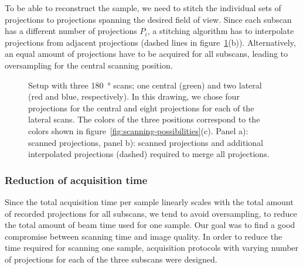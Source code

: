 To be able to reconstruct the sample, we need to stitch the individual sets of projections to projections spanning the desired field of view. Since each subscan has a different number of projections $P_{i}$, a stitching algorithm has to interpolate projections from adjacent projections (dashed lines in figure~\ref{fig:projections}(b)). Alternatively, an equal amount of projections have to be acquired for all subscans, leading to oversampling for the central scanning position.

\ifiucr
	\begin{figure}%
		\caption{Setup with three \SI{180}{\degree} scans; one central (green) and two lateral (red and blue, respectively). In this drawing, we chose four projections for the central and eight projections for each of the lateral scans. The colors of the three positions correspond to the colors shown in figure~\ref{fig:scanning-possibilities}(c). Panel a): scanned projections, panel b): scanned projections and additional interpolated projections (dashed) required to merge all projections.}%
		\label{fig:projections}%
	\end{figure}%
\else
	\begin{figure*}[htp]
		\centering
		\caption{Setup with three \SI{180}{\degree} scans; one central (green) and two lateral (red and blue, respectively). In this drawing, we chose four projections for the central and eight projections for each of the lateral scans. The colors of the three positions correspond to the colors shown in figure~\ref{fig:scanning-possibilities}(c). Panel a): scanned projections, panel b): scanned projections and additional interpolated projections (dashed) required to merge all projections.}%
		\label{fig:projections}
	\end{figure*}
\fi

\subsubsection{Reduction of acquisition time}
\label{subsubsec:reduction-of-acquisition-time}
Since the total acquisition time per sample linearly scales with the total amount of recorded projections for all subscans, we tend to avoid oversampling, to reduce the total amount of beam time used for one sample. Our goal was to find a good compromise between scanning time and image quality. In order to reduce the time required for scanning one sample, acquisition protocols with varying number of projections for each of the three subscans were designed.

